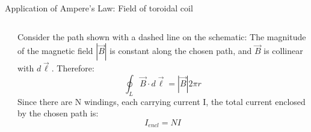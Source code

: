 \begin{frame}{Application of Ampere's Law: Field of toroidal coil}
\begin{columns}
\begin{column}{0.33\textwidth}
\begin{center}
    \end{center}
  \end{column}
  \begin{column}{0.67\textwidth}
      Consider the path shown with a dashed line on the schematic:
      The magnitude of the magnetic field $|\vec{B}|$ is constant along the chosen path, and
      $\vec{B}$ is collinear with $ d\vec{\ell}$. Therefore:
     \begin{equation*}
        \oint_{L} \vec{B} \cdot d\vec{\ell} = |\vec{B}| 2\pi r
     \end{equation*}
     Since there are N windings, each carrying current I, the total current enclosed
     by the chosen path is:
     \begin{equation*}
        I_{encl} = N I
     \end{equation*}
  \end{column}
\end{columns}

\end{frame}

%
%
%

